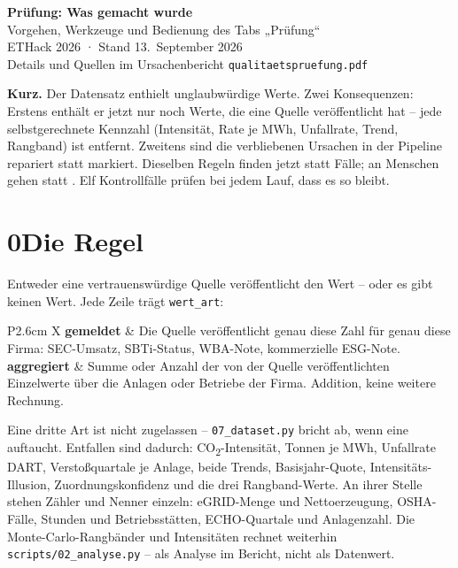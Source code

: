 \documentclass[11pt,a4paper]{article}
\newcommand{\infobox}[1]{\par\noindent\colorbox{softgrey}{\begin{minipage}{\dimexpr\linewidth-2\fboxsep}\small\vspace{3pt}#1\vspace{3pt}\end{minipage}}\par}
\begin{document}
{\LARGE\bfseries\color{navy} Prüfung: Was gemacht wurde}\\[2mm]
{\large Vorgehen, Werkzeuge und Bedienung des Tabs „Prüfung“}\\[1mm]
{\small ETHack 2026 · Stand 13.~September 2026\\ Details und Quellen im Ursachenbericht \texttt{qualitaetspruefung.pdf}}

\vspace{4mm}
\infobox{\textbf{Kurz.} Der Datensatz enthielt unglaubwürdige Werte. Zwei Konsequenzen: Erstens enthält er jetzt nur noch Werte, die eine Quelle veröffentlicht hat -- jede selbstgerechnete Kennzahl (Intensität, Rate je MWh, Unfallrate, Trend, Rangband) ist entfernt. Zweitens sind die verbliebenen Ursachen in der Pipeline repariert statt markiert. Dieselben Regeln finden jetzt \statFlags{} statt \vorFlags{} Fälle; an Menschen gehen \kiMensch{} statt \vorMensch. Elf Kontrollfälle prüfen bei jedem Lauf, dass es so bleibt.}

\section*{0\quad Die Regel}
Entweder eine vertrauenswürdige Quelle veröffentlicht den Wert -- oder es gibt keinen Wert. Jede Zeile trägt \texttt{wert\_art}:

\begin{center}\small
\begin{tabularx}{\textwidth}{P{2.6cm} X}
\toprule
\textbf{gemeldet} & Die Quelle veröffentlicht genau diese Zahl für genau diese Firma: SEC-Umsatz, SBTi-Status, WBA-Note, kommerzielle ESG-Note. \\
\textbf{aggregiert} & Summe oder Anzahl der von der Quelle veröffentlichten Einzelwerte über die Anlagen oder Betriebe der Firma. Addition, keine weitere Rechnung. \\
\bottomrule
\end{tabularx}
\end{center}

Eine dritte Art ist nicht zugelassen -- \texttt{07\_dataset.py} bricht ab, wenn eine auftaucht. Entfallen sind dadurch: CO\textsubscript{2}-Intensität, Tonnen je MWh, Unfallrate DART, Verstoßquartale je Anlage, beide Trends, Basisjahr-Quote, Intensitäts-Illusion, Zuordnungskonfidenz und die drei Rangband-Werte. An ihrer Stelle stehen Zähler und Nenner einzeln: eGRID-Menge und Nettoerzeugung, OSHA-Fälle, Stunden und Betriebsstätten, ECHO-Quartale und Anlagenzahl. Die Monte-Carlo-Rangbänder und Intensitäten rechnet weiterhin \texttt{scripts/02\_analyse.py} -- als Analyse im Bericht, nicht als Datenwert.
\end{document}
